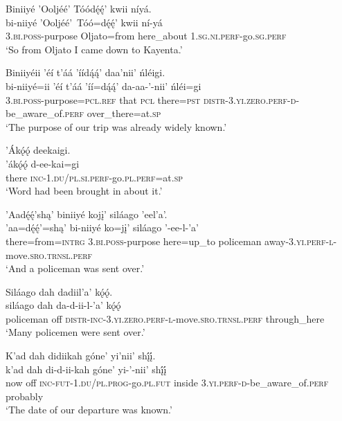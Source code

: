 \ea\label{ex:text7-8-15}
Biniiyé ’Ooljéé’ Tóódę́ę́’ kwii níyá.\\
\gll bi-niiyé	’Ooljéé’~{Tóó=dę́ę́’}	kwii	ní-yá\\
     3.\textsc{bi}.\textsc{poss}-purpose	Oljato=from	here\_about	1.\textsc{sg}.\textsc{ni}.\textsc{perf}-go.\textsc{sg}.\textsc{perf}\\
\glt `So from Oljato I came down to Kayenta.'
\z

\ea\label{ex:text7-9-1}
Biniiyéii ’éí t’áá ’íídą́ą́’ daa’nii’ ńléigi.\\
\gll bi-niiyé=ii	’éí	t’áá	’íí=dą́ą́’	da-aa-’-nii’	ńléi=gi\\
     3.\textsc{bi}.\textsc{poss}-purpose=\textsc{pcl}.\textsc{ref}	that	\textsc{pcl}	there=\textsc{pst}	\textsc{distr}-3.\textsc{yi}.\textsc{zero}.\textsc{perf}-\textsc{d}-be\_aware\_of.\textsc{perf}	over\_there=at.\textsc{sp}\\
\glt `The purpose of our trip was already widely known.'
\z

\ea\label{ex:text7-9-2}
’Ákǫ́ǫ́ deekaigi.\\
\gll ’ákǫ́ǫ́	d-ee-kai=gi\\
     there	\textsc{inc}-1.\textsc{du}/\textsc{pl}.\textsc{si}.\textsc{perf}-go.\textsc{pl}.\textsc{perf}=at.\textsc{sp}\\
\glt `Word had been brought in about it.'
\z

\ea\label{ex:text7-9-3}
’Aadę́ę́’shą’ biniiyé kojį’ siláago ’eel’a’.\\
\gll ’aa=dę́ę́’=shą’	bi-niiyé	ko=jį’	siláago	’-ee-l-’a’\\
     there=from=\textsc{intrg}	3.\textsc{bi}.\textsc{poss}-purpose	here=up\_to	policeman	away-3.\textsc{yi}.\textsc{perf}-\textsc{l}-move.\textsc{sro}.\textsc{trnsl}.\textsc{perf}\\
\glt `And a policeman was sent over.'
\z

\ea\label{ex:text7-9-4}
Siláago dah dadiil’a’ kǫ́ǫ́.\\
\gll siláago	dah	da-d-ii-l-’a’	kǫ́ǫ́\\
     policeman	off	\textsc{distr}-\textsc{inc}-3.\textsc{yi}.\textsc{zero}.\textsc{perf}-\textsc{l}-move.\textsc{sro}.\textsc{trnsl}.\textsc{perf}	through\_here\\
\glt `Many policemen were sent over.'
\z

\ea\label{ex:text7-9-5}
K’ad dah didiikah góne’ yi’nii’ shį́į́.\\
\gll k’ad	dah	di-d-ii-kah	góne’	yi-’-nii’	shį́į́\\
     now	off	\textsc{inc}-\textsc{fut}-1.\textsc{du}/\textsc{pl}.\textsc{prog}-go.\textsc{pl}.\textsc{fut}	inside	3.\textsc{yi}.\textsc{perf}-\textsc{d}-be\_aware\_of.\textsc{perf}	probably\\
\glt `The date of our departure was known.'
\z

